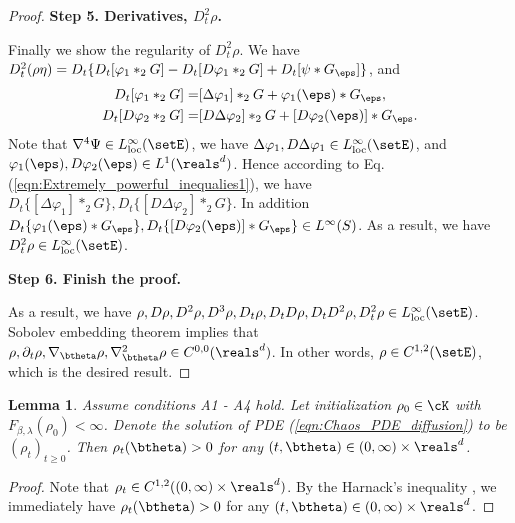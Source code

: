 \documentclass[11pt]{article}
\newtheorem{lemma}{Lemma}
\begin{document}
\begin{proof}
\noindent
{\bf Step 5. Derivatives, $D_t^2\rho$.}


Finally we show the regularity of $D_t^2 \rho$. We have $D_t^2 (\rho\eta) = D_t\{ D_t [\varphi_1 *_2 G ] - D_t [ D \varphi_1 *_2 G ] + D_t[\psi * G_\eps]\}$, and
\begin{align}
D_t[\varphi_1 *_2 G] =& [\Delta \varphi_1 ] *_2 G + \varphi_1(\eps) * G_\eps,\\
D_t [D\varphi_2 *_2 G] =& [D\Delta\varphi_2] *_2 G + [D \varphi_2(\eps)] * G_\eps.
\end{align}
Note that $\nabla^4 \Psi \in L_{\rm loc}^\infty(\setE)$, we have $\Delta \varphi_1, D \Delta \varphi_1 \in L_{\rm loc}^\infty(\setE)$, and $\varphi_1(\eps), D \varphi_2(\eps) \in L^1(\reals^d)$. Hence according to Eq. (\ref{eqn:Extremely_powerful_inequalies1}), we have $D_t \{[\Delta \varphi_1 ] *_2 G \}, D_t\{[D \Delta \varphi_2 ] *_2 G\}$. In addition $D_t \{\varphi_1(\eps) * G_\eps\}, D_t\{[D \varphi_2(\eps)] * G_\eps\} \in L^\infty(S)$. As a result, we have $D_t^2 \rho \in L_{\rm loc}^\infty(\setE)$.  

\noindent
{\bf Step 6. Finish the proof. }

As a result, we have $\rho, D\rho, D^2 \rho, D^3 \rho, D_t \rho, D_t D \rho, D_t D^2 \rho, D_t^2 \rho \in L_{\rm loc}^\infty(\setE)$. Sobolev embedding theorem implies that $\rho, \partial_t \rho, \nabla_\btheta \rho, \nabla^2_\btheta \rho \in C^{0, 0}(\reals^d)$. In other words, $\rho \in C^{1,2}(\setE)$, which is the desired result. 


\end{proof}

\begin{lemma}
Assume conditions {\sf A1} - {\sf A4} hold. Let initialization $\rho_0 \in \cK$ with $F_{\beta, \lambda}(\rho_0) < \infty$. Denote the solution of PDE (\ref{eqn:Chaos_PDE_diffusion})  to be $(\rho_t)_{t \ge 0}$. Then $\rho_t (\btheta) > 0$ for any $(t, \btheta) \in (0, \infty) \times \reals^d$. 

\end{lemma}

\begin{proof}

Note that $\rho_t \in C^{1,2}((0, \infty) \times \reals^d)$. By the Harnack's inequality \cite{evans2009partial}, we immediately have $\rho_t(\btheta) > 0$ 
for any $(t, \btheta) \in (0, \infty) \times \reals^d$. 

\end{proof}
\end{document}
